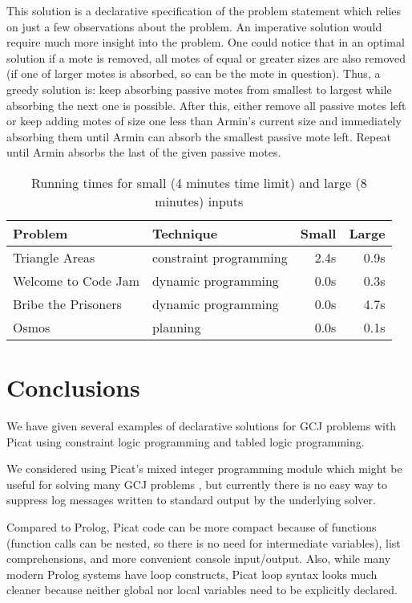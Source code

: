 \documentclass{llncs}
\begin{document}
This solution is a declarative specification of the problem statement which relies on just a few observations about the problem.
An imperative solution would require much more insight into the problem. One could notice that in an optimal solution if a mote is removed, all motes of equal or greater sizes are also removed (if one of larger motes is absorbed, so can be the mote in question). Thus, a greedy solution is: keep absorbing passive motes from smallest to largest while absorbing the next one is possible. After this, either remove all passive motes left or keep adding motes of size one less than Armin's current size and immediately absorbing them until Armin can absorb the smallest passive mote left. Repeat until Armin absorbs the last of the given passive motes.


\begin{table}
\centering
\caption{Running times for small (4 minutes time limit) and large (8 minutes) inputs\protect\footnotemark}
\label{table:times}
\begin{tabular}{llrr}
\hline
Problem               & Technique &  Small   & Large \\
\hline
Triangle Areas        & constraint programming      & 2.4s & 0.9s \\
Welcome to Code Jam   & dynamic programming         & 0.0s & 0.3s \\
Bribe the Prisoners   & dynamic programming         & 0.0s & 4.7s \\
Osmos                 & planning                    & 0.0s & 0.1s \\
\hline
\end{tabular}
\end{table}
\section{Conclusions}

We have given several examples of declarative solutions for GCJ problems with Picat using constraint logic programming and tabled logic programming.

We considered using Picat's mixed integer programming module which might be useful for solving many GCJ problems \cite{gcj-eclipse-arxiv},
but currently there is no easy way to suppress log messages written to standard output by the underlying solver.

Compared to Prolog, Picat code can be more compact because of functions (function calls can be nested,
so there is no need for intermediate variables), list comprehensions, and more convenient console input/output.
Also, while many modern Prolog systems have loop constructs,
Picat loop syntax looks much cleaner because neither global nor local variables need to be explicitly declared.
\end{document}
